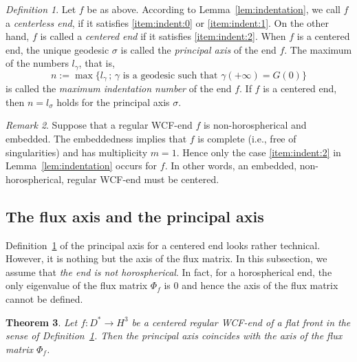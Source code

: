 \documentclass[a4paper]{amsart}
\theoremstyle{plain}
\newtheorem{theorem}{Theorem}[section]
\theoremstyle{remark}
\newtheorem{definition}[theorem]{Definition}
\newtheorem{remark}[theorem]{Remark}
\numberwithin{equation}{section}
\begin{document}
\begin{definition}\label{def:central-axis}
 Let $f$ be as above.
 According to Lemma~\ref{lem:indentation},
 we call $f$ a {\em centerless end\/},
 if it satisfies \ref{item:indent:0} or \ref{item:indent:1}.
 On the other hand,
 $f$ is called a {\em centered end} if
 it satisfies \ref{item:indent:2}.
 When $f$ is a centered end, the unique geodesic $\sigma$
 is called the {\em principal axis\/} of the end $f$.
 The maximum  of the numbers $l_\gamma$, that is,
 \[
    n:=\max\{l_\gamma\,;\, 
   \mbox{$\gamma$ is a geodesic such that $\gamma(+\infty)=G(0)$}\}
 \]
 is called the {\em maximum indentation number\/} of the end $f$.
 If $f$ is a centered end,
 then $n=l_{\sigma}$ holds for the principal axis $\sigma$.
\end{definition}
\begin{remark}\label{rem:central}
Suppose that a regular WCF-end $f$ is non-horospherical 
and embedded. The embeddedness implies that $f$ is 
complete  
(i.e., free of singularities) 
and has multiplicity $m=1$. 
Hence only the case \ref{item:indent:2} in Lemma~\ref{lem:indentation}
occurs for $f$. 
In other words, an embedded, non-horospherical, regular 
WCF-end must be centered. 
\end{remark}
\subsection*{The flux axis and the principal axis}

Definition~\ref{def:central-axis} of the principal axis
for a centered end looks rather technical.
However, it is nothing but the axis of the flux matrix.
In this subsection, we assume that 
{\em the end is not horospherical}.
In fact, for a horospherical end, the only eigenvalue of the flux matrix
$\Phi_f$ is $0$ and hence the axis of the flux matrix cannot be defined.
\begin{theorem}\label{thm:central-flux}
 Let $f\colon{}D^*\to H^3$ be a centered regular WCF-end of a flat front
 in the sense of Definition~\ref{def:central-axis}.
 Then the principal axis coincides with the 
 axis of the flux matrix $\Phi_f$.
\end{theorem}
\end{document}
